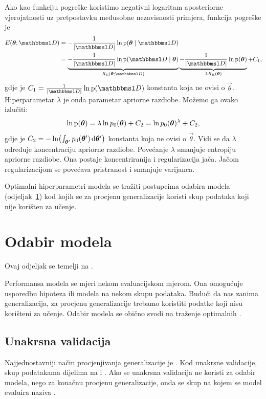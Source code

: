 \documentclass[utf8, diplomski, lmodern]{fer}
\begin{document}
Ako kao funkciju pogreške koristimo negativni logaritam aposteriorne vjerojatnosti uz pretpostavku međusobne nezavisnosti primjera, funkcija pogreške je
\begin{align}
E(\vec\theta;\set{D}) 
&= -\frac{1}{\envert{\set D}}\ln\p(\vec\theta\mid\set{D}) \\
&= 
\underbrace{-\frac{1}{\envert{\set D}}\ln\p(\set{D}\mid\vec\theta)}_{R_\text{E}(\vec\theta;\set{D})}
\underbrace{-\frac{1}{\envert{\set D}}\ln\p(\vec\theta)}_{\lambda R_\text{R}(\vec\theta)} + C_1
\text{,}
\end{align}
gdje je $C_1=\frac{1}{\envert{\set D}}\ln\p(\set D)$ konstanta koja ne ovisi o $\vec\theta$. Hiperparametar $\lambda$ je onda parametar apriorne razdiobe. Možemo ga ovako izlučiti:
\begin{align}
\ln\p(\vec\theta)=\lambda \ln p_0(\vec\theta) +C_2 = \ln p_0(\vec\theta)^\lambda +C_2 \text{,}
\end{align}
gdje je $C_2=-\ln\del{\int_{\vec{\theta'}}p_0(\vec\theta')\dif\vec{\theta'}}$ konstanta koja ne ovisi o $\vec\theta$. Vidi se da $\lambda$ određuje koncentraciju apriorne razdiobe. Povećanje $\lambda$ smanjuje entropiju apriorne razdiobe. Ona postaje koncentriranija i regularizacija jača. Jačom regularizacijom se povećava pristranost i smanjuje varijanca.

Optimalni hiperparametri modela se tražiti postupcima odabira modela (odjeljak~\ref{sec:su-odabir-modela}) kod kojih se za procjenu generalizacije koristi skup podataka koji nije korišten za učenje.


\section{Odabir modela} \label{sec:su-odabir-modela}

Ovaj odjeljak se temelji na \citet[odjeljak 2.6]{Snajder:2014:SU}. 

Performansa modela se mjeri nekom evaluacijskom mjerom. Ona omogućuje usporedbu hipoteza ili modela na nekom skupu podataka. Budući da nas zanima generalizacija, za procjenu generalizacije trebamo koristiti podatke koji nisu korišteni za učenje. Odabir modela se obično svodi na traženje optimalnih .

\subsection{Unakrsna validacija}

Najjednostavniji način procjenjivanja generalizacije je . Kod unakrsne validacije, skup podatakama dijelima na  i . Ako se unakrsna validacija ne koristi za odabir modela, nego za konačnu procjenu generalizacije, onda se skup na kojem se model evaluira naziva .
\end{document}
